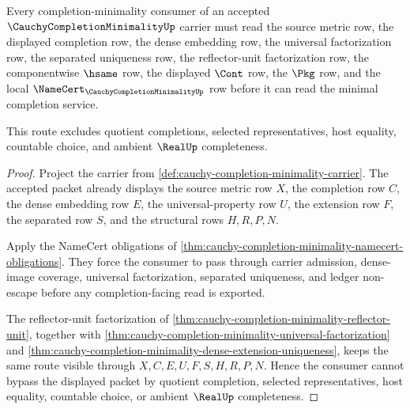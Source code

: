 \begin{theorem}
\label{thm:cauchy-completion-minimality-replay-nonescape}
Every completion-minimality consumer of an accepted $\CauchyCompletionMinimalityUp$ carrier must read the source metric row, the displayed completion row, the dense embedding row, the universal factorization row, the separated uniqueness row, the reflector-unit factorization row, the componentwise $\hsame$ row, the displayed $\Cont$ row, the $\Pkg$ row, and the local $\NameCert_{\CauchyCompletionMinimalityUp}$ row before it can read the minimal completion service.

This route excludes quotient completions, selected representatives, host equality, countable choice, and ambient $\RealUp$ completeness.
\end{theorem}
\begin{proof}
Project the carrier from \autoref{def:cauchy-completion-minimality-carrier}. The accepted packet already displays the source metric row $X$, the completion row $C$, the dense embedding row $E$, the universal-property row $U$, the extension row $F$, the separated row $S$, and the structural rows $H,R,P,N$.

Apply the NameCert obligations of \autoref{thm:cauchy-completion-minimality-namecert-obligations}. They force the consumer to pass through carrier admission, dense-image coverage, universal factorization, separated uniqueness, and ledger non-escape before any completion-facing read is exported.

The reflector-unit factorization of \autoref{thm:cauchy-completion-minimality-reflector-unit}, together with \autoref{thm:cauchy-completion-minimality-universal-factorization} and \autoref{thm:cauchy-completion-minimality-dense-extension-uniqueness}, keeps the same route visible through $X,C,E,U,F,S,H,R,P,N$. Hence the consumer cannot bypass the displayed packet by quotient completion, selected representatives, host equality, countable choice, or ambient $\RealUp$ completeness.
\end{proof}

